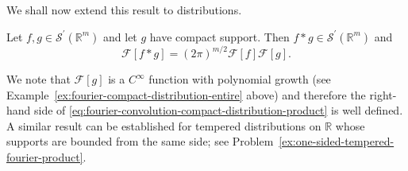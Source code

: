 We shall now extend this result to distributions.

\begin{Theorem}
\label{thm:fourier-convolution-compact-distribution}
Let $f,g\in\mathcal{S}^{\prime}(\mathbb{R}^m)$ and let $g$ have compact support. Then $f*g\in\mathcal{S}^{\prime}(\mathbb{R}^m)$ and
\begin{equation}\label{eq:fourier-convolution-compact-distribution-product}
\mathcal{F}[f*g]=(2\pi)^{m/2}\mathcal{F}[f]\mathcal{F}[g].
\end{equation}

\end{Theorem}

We note that $\mathcal{F}[g]$ is a $C^\infty$ function with polynomial growth (see Example~\ref{ex:fourier-compact-distribution-entire} above) and therefore the right-hand side of \eqref{eq:fourier-convolution-compact-distribution-product} is well defined. A similar result can be established for tempered distributions on $\mathbb{R}$ whose supports are bounded from the same side; see Problem~\ref{ex:one-sided-tempered-fourier-product}.

